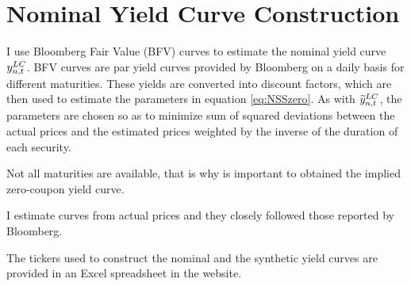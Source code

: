 \begin{appendices}
\begin{landscape}

	
	
	
	
	
	
	
	
	
	
\end{landscape}
\restoregeometry

\section{Nominal Yield Curve Construction} \label{sec:BFVcurves}
I use Bloomberg Fair Value (BFV) curves to estimate the nominal yield curve $y_{n,t} ^{LC}$. BFV curves are par yield curves provided by Bloomberg on a daily basis for different maturities. These yields are converted into discount factors, which are then used to estimate the parameters in equation \ref{eq:NSSzero}. As with $\widetilde{y}_{n,t} ^{LC}$, the parameters are chosen so as to minimize sum of squared deviations between the actual prices and the estimated prices weighted by the inverse of the duration of each security.

Not all maturities are available, that is why is important to obtained the implied zero-coupon yield curve.

I estimate curves from actual prices and they closely followed those reported by Bloomberg.

The tickers used to construct the nominal and the synthetic yield curves are provided in an Excel spreadsheet in the website.

\end{appendices}